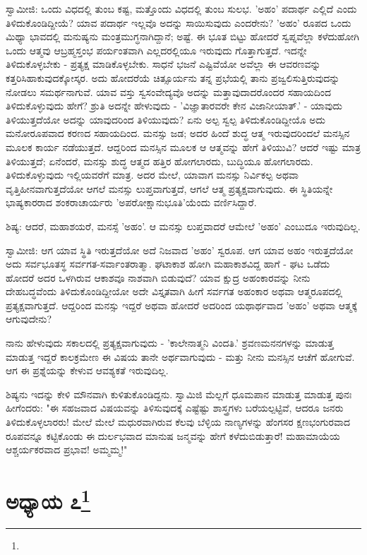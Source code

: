 ಸ್ವಾಮೀಜಿ: ಒಂದು ವಿಧದಲ್ಲಿ ತುಂಬ ಕಷ್ಟ, ಮತ್ತೊಂದು ವಿಧದಲ್ಲಿ ತುಂಬ ಸುಲಭ. 'ಅಹಂ' ಪದಾರ್ಥ ಎಲ್ಲಿದೆ ಎಂದು ತಿಳಿದುಕೊಂಡಿದ್ದೀಯೆ? ಯಾವ ಪದಾರ್ಥ ಇಲ್ಲವೊ ಅದನ್ನು ಸಾಯಿಸುವುದು ಎಂದರೇನು? 'ಅಹಂ' ರೂಪದ ಒಂದು ಮಿಥ್ಯಾ ಭಾವದಲ್ಲಿ ಮನುಷ್ಯನು ಮಂತ್ರಮುಗ್ಧನಾಗಿದ್ದಾನೆ; ಅಷ್ಟೆ. ಈ ಭೂತ ಬಿಟ್ಟು ಹೋದರೆ ಸ್ವಪ್ನವೆಲ್ಲಾ ಕಳೆದುಹೋಗಿ ಒಂದು ಆತ್ಮವು ಆಬ್ರಹ್ಮಸ್ತಂಭ ಪರ್ಯಂತವಾಗಿ ಎಲ್ಲದರಲ್ಲಿಯೂ ಇರುವುದು ಗೊತ್ತಾಗುತ್ತದೆ. ಇದನ್ನೇ ತಿಳಿದುಕೊಳ್ಳಬೇಕು - ಪ್ರತ್ಯಕ್ಷ ಮಾಡಿಕೊಳ್ಳಬೇಕು. ಸಾಧನೆ ಭಜನೆ ಎಷ್ಟಿವೆಯೋ ಅವೆಲ್ಲಾ ಈ ಆವರಣವನ್ನು ಕತ್ತರಿಸಿಹಾಕುವುದಕ್ಕೋಸ್ಕರ. ಅದು ಹೋದರೆಯೆ ಚಿತ್ಸೂರ್ಯನು ತನ್ನ ಪ್ರಭೆಯಲ್ಲಿ ತಾನು ಪ್ರಜ್ವಲಿಸುತ್ತಿರುವುದನ್ನು ನೋಡಲು ಸಮರ್ಥನಾಗುವೆ. ಯಾವ ವಸ್ತು ಸ್ವಸಂವೇದ್ಯವೊ ಅದನ್ನು ಮತ್ತಾವುದಾದರೊಂದರ ಸಹಾಯದಿಂದ ತಿಳಿದುಕೊಳ್ಳುವುದು ಹೇಗೆ? ಶ್ರುತಿ ಅದನ್ನೇ ಹೇಳುವುದು - 'ವಿಜ್ಞಾತಾರವರೇ ಕೇನ ವಿಜಾನೀಯಾತ್.' - ಯಾವುದು ತಿಳಿಯುತ್ತದೆಯೋ ಅದನ್ನು ಯಾವುದರಿಂದ ತಿಳಿಯುವುದು? ಏನು ಅಲ್ಪ ಸ್ವಲ್ಪ ತಿಳಿದುಕೊಂಡಿದ್ದೀಯೊ ಅದು ಮನೋರೂಪವಾದ ಕರಣದ ಸಹಾಯದಿಂದ. ಮನಸ್ಸು ಜಡ; ಅದರ ಹಿಂದೆ ಶುದ್ಧ ಆತ್ಮ ಇರುವುದರಿಂದಲೆ ಮನಸ್ಸಿನ ಮೂಲಕ ಕಾರ್ಯ ನಡೆಯುತ್ತದೆ. ಆದ್ದರಿಂದ ಮನಸ್ಸಿನ ಮೂಲಕ ಆ ಆತ್ಮವನ್ನು ಹೇಗೆ ತಿಳಿಯುವಿ? ಆದರೆ ಇಷ್ಟು ಮಾತ್ರ ತಿಳಿಯುತ್ತದೆ; ಏನೆಂದರೆ, ಮನಸ್ಸು ಶುದ್ಧ ಆತ್ಮದ ಹತ್ತಿರ ಹೋಗಲಾರದು, ಬುದ್ಧಿಯೂ ಹೋಗಲಾರದು. ತಿಳಿದುಕೊಳ್ಳುವುದು ಇಲ್ಲಿಯವರೆಗೆ ಮಾತ್ರ. ಅದರ ಮೇಲೆ, ಯಾವಾಗ ಮನಸ್ಸು ನಿರ್ವಿಕಲ್ಪ ಅಥವಾ ವೃತ್ತಿಹೀನವಾಗುತ್ತದೆಯೋ ಆಗಲೆ ಮನಸ್ಸು ಲುಪ್ತವಾಗುತ್ತದೆ, ಆಗಲೆ ಆತ್ಮ ಪ್ರತ್ಯಕ್ಷವಾಗುವುದು. ಈ ಸ್ಥಿತಿಯನ್ನೇ ಭಾಷ್ಯಕಾರರಾದ ಶಂಕರಾಚಾರ್ಯರು 'ಅಪರೋಕ್ಷಾನುಭೂತಿ'ಯೆಂದು ವರ್ಣಿಸಿದ್ದಾರೆ.

ಶಿಷ್ಯ: ಆದರೆ, ಮಹಾಶಯರೆ, ಮನಸ್ಸೆ 'ಅಹಂ'. ಆ ಮನಸ್ಸು ಲುಪ್ತವಾದರೆ ಆಮೇಲೆ 'ಅಹಂ' ಎಂಬುದೂ ಇರುವುದಿಲ್ಲ.

ಸ್ವಾಮೀಜಿ: ಆಗ ಯಾವ ಸ್ಥಿತಿ ಇರುತ್ತದೆಯೋ ಅದೆ ನಿಜವಾದ 'ಅಹಂ' ಸ್ವರೂಪ. ಆಗ ಯಾವ ಅಹಂ ಇರುತ್ತದೆಯೋ ಅದು ಸರ್ವಭೂತಸ್ಥ ಸರ್ವಗತ-ಸರ್ವಾಂತರಾತ್ಮಾ. ಘಟಾಕಾಶ ಹೋಗಿ ಮಹಾಕಾಶವಿದ್ದ ಹಾಗೆ - ಘಟ ಒಡೆದು ಹೋದರೆ ಅದರ ಒಳಗಿರುವ ಆಕಾಶವೂ ನಾಶವಾಗಿ ಬಿಡುವುದೆ? ಯಾವ ಕ್ಷುದ್ರ ಅಹಂಕಾರವನ್ನು ನೀನು ದೇಹಬದ್ಧವೆಂದು ತಿಳಿದುಕೊಂಡಿದ್ದೀಯೋ ಅದೇ ವಿಸ್ತೃತವಾಗಿ ಹೀಗೆ ಸರ್ವಗತ ಅಹಂಕಾರ ಅಥವಾ ಆತ್ಮರೂಪದಲ್ಲಿ ಪ್ರತ್ಯಕ್ಷವಾಗುತ್ತದೆ. ಆದ್ದರಿಂದ ಮನಸ್ಸು ಇದ್ದರೆ ಅಥವಾ ಹೋದರೆ ಅದರಿಂದ ಯಥಾರ್ಥವಾದ 'ಅಹಂ' ಅಥವಾ ಆತ್ಮಕ್ಕೆ ಆಗುವುದೇನು?

ನಾನು ಹೇಳುವುದು ಸಕಾಲದಲ್ಲಿ ಪ್ರತ್ಯಕ್ಷವಾಗುವುದು - 'ಕಾಲೇನಾತ್ಮನಿ ವಿಂದತಿ.' ಶ್ರವಣಮನನಗಳನ್ನು ಮಾಡುತ್ತ ಮಾಡುತ್ತ ಇದ್ದರೆ ಕಾಲಕ್ರಮೇಣ ಈ ವಿಷಯ ತಾನೇ ಅರ್ಥವಾಗುವುದು - ಮತ್ತು ನೀನು ಮನಸ್ಸಿನ ಆಚೆಗೆ ಹೋಗುವೆ. ಆಗ ಈ ಪ್ರಶ್ನೆಯನ್ನು ಕೇಳುವ ಆವಶ್ಯಕತೆ ಇರುವುದಿಲ್ಲ.

ಶಿಷ್ಯನು ಇದನ್ನು ಕೇಳಿ ಮೌನವಾಗಿ ಕುಳಿತುಕೊಂಡಿದ್ದನು. ಸ್ವಾಮಿಜಿ ಮೆಲ್ಲಗೆ ಧೂಮಪಾನ ಮಾಡುತ್ತ ಮಾಡುತ್ತ ಪುನಃ ಹೀಗೆಂದರು: "ಈ ಸಹಜವಾದ ವಿಷಯವನ್ನು ತಿಳಿಸುವುದಕ್ಕೆ ಎಷ್ಟೆಷ್ಟು ಶಾಸ್ತ್ರಗಳು ಬರೆಯಲ್ಪಟ್ಟಿವೆ, ಆದರೂ ಜನರು ತಿಳಿದುಕೊಳ್ಳಲಾರರು! ಮೇಲೆ ಮೇಲೆ ಮಧುರವಾಗಿರುವ ಕೆಲವು ಬೆಳ್ಳಿಯ ನಾಣ್ಯಗಳನ್ನು ಹೆಂಗಸರ ಕ್ಷಣಭಂಗುರವಾದ ರೂಪವನ್ನೂ ಕಟ್ಟಿಕೊಂಡು ಈ ದುರ್ಲಭವಾದ ಮಾನುಷ ಜನ್ಮವನ್ನು ಹೇಗೆ ಕಳೆದುಬಿಡುತ್ತಾರೆ! ಮಹಾಮಾಯೆಯ ಆಶ್ಚರ್ಯಕರವಾದ ಪ್ರಭಾವ! ಅಮ್ಮಮ್ಮ!"

\newpage

\chapter[ಅಧ್ಯಾಯ ೭]{ಅಧ್ಯಾಯ ೭\protect\footnote{}}


